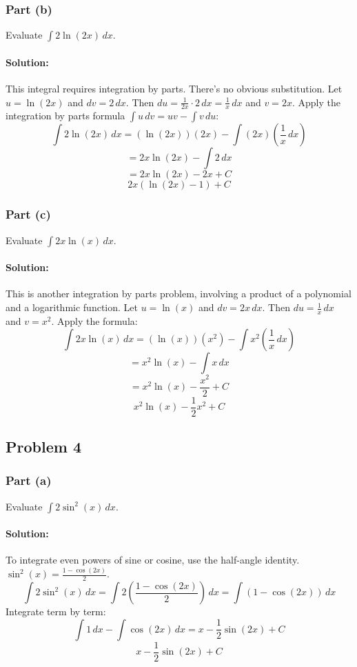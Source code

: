 \documentclass{article}
\begin{document}
\subsubsection*{Part (b)}
Evaluate $\int 2\ln(2x) \, dx$.
\paragraph{Solution:} This integral requires integration by parts. There's no obvious substitution.
Let $u = \ln(2x)$ and $dv = 2 \, dx$.
Then $du = \frac{1}{2x} \cdot 2 \, dx = \frac{1}{x} \, dx$ and $v = 2x$.
Apply the integration by parts formula $\int u \, dv = uv - \int v \, du$:
\[ \int 2\ln(2x) \, dx = (\ln(2x))(2x) - \int (2x)\left(\frac{1}{x} \, dx\right) \]
\[ = 2x\ln(2x) - \int 2 \, dx \]
\[ = 2x\ln(2x) - 2x + C \]
\[ \boxed{2x(\ln(2x) - 1) + C} \]

\subsubsection*{Part (c)}
Evaluate $\int 2x\ln(x) \, dx$.
\paragraph{Solution:} This is another integration by parts problem, involving a product of a polynomial and a logarithmic function.
Let $u = \ln(x)$ and $dv = 2x \, dx$.
Then $du = \frac{1}{x} \, dx$ and $v = x^2$.
Apply the formula:
\[ \int 2x\ln(x) \, dx = (\ln(x))(x^2) - \int x^2 \left(\frac{1}{x} \, dx\right) \]
\[ = x^2\ln(x) - \int x \, dx \]
\[ = x^2\ln(x) - \frac{x^2}{2} + C \]
\[ \boxed{x^2\ln(x) - \frac{1}{2}x^2 + C} \]

\subsection{Problem 4}
\subsubsection*{Part (a)}
Evaluate $\int 2\sin^2(x) \, dx$.
\paragraph{Solution:} To integrate even powers of sine or cosine, use the half-angle identity.
$\sin^2(x) = \frac{1 - \cos(2x)}{2}$.
\[ \int 2\sin^2(x) \, dx = \int 2\left(\frac{1 - \cos(2x)}{2}\right) \, dx = \int (1 - \cos(2x)) \, dx \]
Integrate term by term:
\[ \int 1 \, dx - \int \cos(2x) \, dx = x - \frac{1}{2}\sin(2x) + C \]
\[ \boxed{x - \frac{1}{2}\sin(2x) + C} \]
\end{document}
